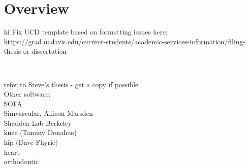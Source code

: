 \chapter{Overview}
%

hi
Fix UCD template based on formatting issues here: https://grad.ucdavis.edu/current-students/academic-services-information/filing-thesis-or-dissertation

~\cite{heartmech}~\cite{newheartpaper}~\cite{vorocrust1,vorocrust2,simpleware,persson}

refer to Steve's thesis - get a copy if possible \\
Other software:\\
SOFA\\
Simvascular, Allison Marsden\\
Shadden Lab Berkeley\\
knee (Tammy Donahue) \\
hip (Dave Fhyrie) \\
heart \\
orthodontic \\